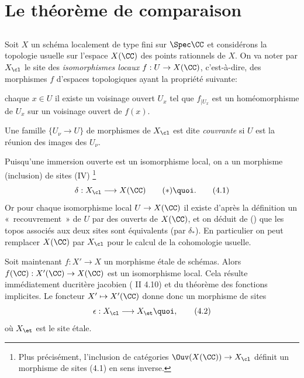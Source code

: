 \documentclass[10pt]{../fichiers-configuration-latex/smfart}
\begin{document}
\section{Le théorème de comparaison}

\setcounter{subsection}{-1}
\subsection{}
Soit $X$ un schéma localement de type fini sur $\Spec \CC$ et
considérons la topologie usuelle sur l'espace $X(\CC)$ des
points rationnels de $X$. On va noter par $X_{\cl}$ le site des
\emph{isomorphismes locaux} $f:U\rightarrow X(\CC)$,
c'est-à-dire, des morphismes $f$ d'espaces topologiques ayant la
propriété suivante:

 chaque $x\in U$ il existe un voisinage ouvert $U_x$ tel que
$f_{\mid U_x}$ est un homéomorphisme de $U_x$ sur un voisinage ouvert de
$f(x)$. 

Une famille $\{U_{\nu}\rightarrow U\}$ de morphismes de $X_{\cl}$ est
dite \emph{couvrante} si $U$ est la réunion des images des $U_{\nu}$.

Puisqu'une immersion ouverte est un isomorphisme local, on a un
morphisme (inclusion) de sites (IV\quad ) %
\footnote{Plus précisément, l'inclusion de catégories
  $\Ouv(X(\CC))\rightarrow X_{\cl}$ définit un morphisme de
  sites (4.1) en sens inverse.}
\begin{equation*}
\delta:X_{\cl}\longrightarrow X(\CC)\qquad
(\ast){\quoi}.\tag{4.1}
\end{equation*}
Or pour chaque isomorphisme local $U\rightarrow X(\CC)$ il
existe d'après la définition un « recouvrement » de $U$ par des
ouverts de $X(\CC)$, et on déduit de (\quad) que les topos %
associés aux deux sites sont équivalents (par $\delta_{\ast}$). En
particulier on peut remplacer $X(\CC)$ par $X_{\cl}$ pour le
calcul de la cohomologie usuelle.

Soit maintenant $f:X'\rightarrow X$ un morphisme étale de
schémas. Alors $f(\CC):X'(\CC)\rightarrow X(\CC)$
est un isomorphisme local. Cela résulte immédiatement du\pageoriginale critère
jacobien ( II 4.10) et du théorème des fonctions implicites. Le
foncteur $X'\mapsto X'(\CC)$ donne donc un morphisme de sites
\begin{equation*}
\epsilon:X_{\cl}\longrightarrow X_{\et}{\quoi},\tag{4.2}
\end{equation*}
où $X_{\et}$ est le site étale.
\end{document}
